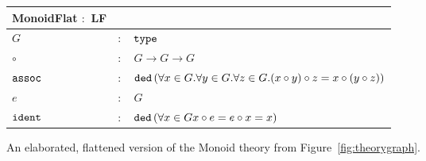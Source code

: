 \begin{figure}[h]
  \begin{center}
    \begin{tabular}{|l c l|}
      \hline
      \textsf{MonoidFlat} $:$ \textsf{LF} & &\\\hline
      $G$ & $:$ & $ \typett$\\
      $\circ$ & $:$ & $ G \rightarrow G \rightarrow G$\\
      $\plaintt{assoc}$& $:$ & $ \plaintt{ded}\left( \forall x \in G . \forall y \in G . \forall z \in G . (x\circ y)\circ z=x\circ (y\circ z) \right)$\\
      $e$ & $:$ & $G$\\
      $\plaintt{ident}$& $:$ & $ \plaintt{ded}\left( \forall x \in G x\circ e = e\circ x = x \right) $\\
      \hline
    \end{tabular}
  \end{center}

  \caption[A flattened Theory of Monoids]{
    An elaborated, flattened version of the Monoid theory from Figure~\ref{fig:theorygraph}. 
  }
  \label{fig:flattheory}
\end{figure}
